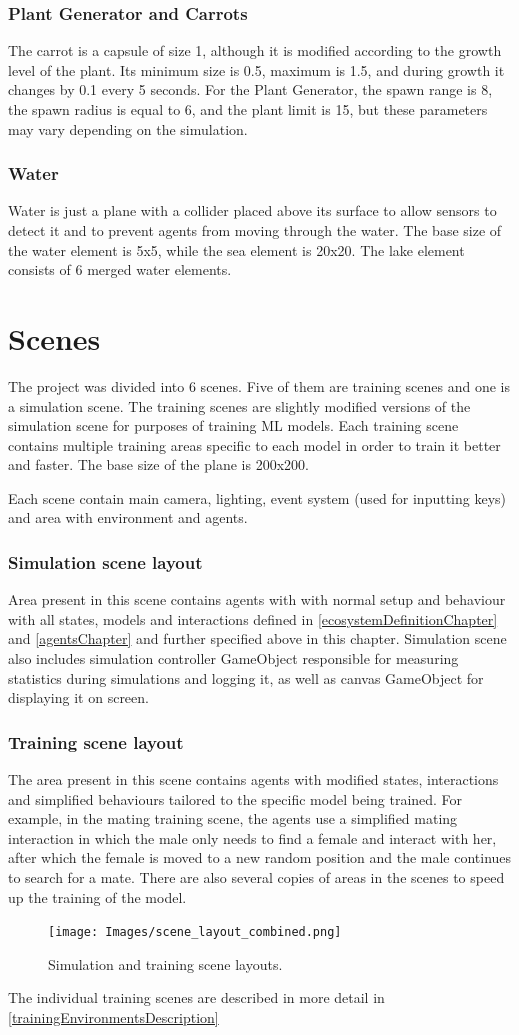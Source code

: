 \subsubsection{Plant Generator and Carrots}
The carrot is a capsule of size 1, although it is modified according to the growth level of the plant. Its minimum size is 0.5, maximum is 1.5, and during growth it changes by 0.1 every 5 seconds. For the Plant Generator, the spawn range is 8, the spawn radius is equal to 6, and the plant limit is 15, but these parameters may vary depending on the simulation.

\subsubsection{Water}
Water is just a plane with a collider placed above its surface to allow sensors to detect it and to prevent agents from moving through the water. The base size of the water element is 5x5, while the sea element is 20x20. The lake element consists of 6 merged water elements.

\section{Scenes}
The project was divided into 6 scenes. Five of them are training scenes and one is a simulation scene. The training scenes are slightly modified versions of the simulation scene for purposes of training ML models. Each training scene contains multiple training areas specific to each model in order to train it better and faster. The base size of the plane is 200x200. 

Each scene contain main camera, lighting, event system (used for inputting keys) and area with environment and agents.

\subsubsection{Simulation scene layout}
Area present in this scene contains agents with with normal setup and behaviour with all states, models and interactions defined in \autoref{ecosystemDefinitionChapter} and \autoref{agentsChapter} and further specified above in this chapter.
Simulation scene also includes simulation controller GameObject responsible for measuring statistics during simulations and logging it, as well as canvas GameObject for displaying it on screen.

\subsubsection{Training scene layout}
The area present in this scene contains agents with modified states, interactions and simplified behaviours tailored to the specific model being trained. For example, in the mating training scene, the agents use a simplified mating interaction in which the male only needs to find a female and interact with her, after which the female is moved to a new random position and the male continues to search for a mate. There are also several copies of areas in the scenes to speed up the training of the model.

\begin{figure}
    \centering
    \texttt{[image: Images/scene\_layout\_combined.png]}
    \caption{Simulation and training scene layouts.}
    \label{fig:sceneLayout}
\end{figure}

The individual training scenes are described in more detail in \autoref{trainingEnvironmentsDescription}
